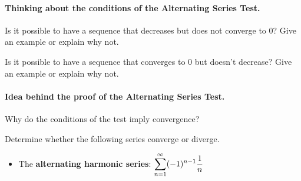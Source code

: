 \documentclass[12pt]{article}
\begin{document}

\vspace{4mm}


\vspace{5mm}

\paragraph{Thinking about the conditions of the Alternating Series Test.} Is it possible to have a sequence that decreases but does not converge to 0? Give an example or explain why not.

\vfill

Is it possible to have a sequence that converges to 0 but doesn't decrease? Give an example or explain why not.

\vfill

\newpage

\paragraph{Idea behind the proof of the Alternating Series Test.} Why do the conditions of the test imply convergence?

\vfill

\Examples Determine whether the following series converge or diverge.

\vspace{2mm}

\begin{itemize}
\item[\tc{1}] The \textbf{alternating harmonic series}: $\displaystyle\sum_{n=1}^\infty(-1)^{n-1}\dfrac{1}{n}$

\end{itemize}
\end{document}
